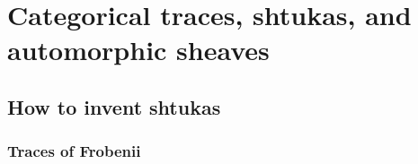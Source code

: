 \chapter{Categorical traces, shtukas, and automorphic sheaves} \label{chapter: automorphic_forms}
    \begin{abstract}
        
    \end{abstract}
    
    \section{How to invent shtukas}
        \subsection{Traces of Frobenii}
